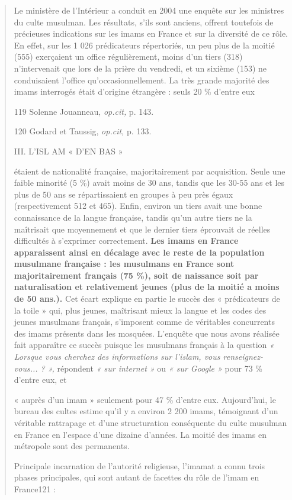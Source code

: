 \begin{quote}
Le ministère de l'Intérieur a conduit en 2004 une enquête sur les
ministres du culte musulman. Les résultats, s'ils sont anciens, offrent
toutefois de précieuses indications sur les imams en France et sur la
diversité de ce rôle. En effet, sur les 1 026 prédicateurs répertoriés,
un peu plus de la moitié (555) exerçaient un office régulièrement, moins
d'un tiers (318) n'intervenait que lors de la prière du vendredi, et un
sixième (153) ne conduisaient l'office qu'occasionnellement. La très
grande majorité des imams interrogés était d'origine étrangère : seuls
20 \% d'entre eux

119 Solenne Jouanneau, \emph{op.cit,} p. 143.

120 Godard et Taussig, \emph{op.cit,} p. 133.

III. L'ISL AM « D'EN BAS »

étaient de nationalité française, majoritairement par acquisition. Seule
une faible minorité (5 \%) avait moins de 30 ans, tandis que les 30-55
ans et les plus de 50 ans se répartissaient en groupes à peu près égaux
(respectivement 512 et 465). Enfin, environ un tiers avait une bonne
connaissance de la langue française, tandis qu'un autre tiers ne la
maîtrisait que moyennement et que le dernier tiers éprouvait de réelles
difficultés à s'exprimer correctement. \textbf{Les imams en France
apparaissent ainsi en décalage avec le reste de la population musulmane
française : les musulmans en France sont majoritairement français (75
\%), soit de naissance soit par naturalisation et relativement jeunes
(plus de la moitié a moins de 50 ans.).} Cet écart explique en partie le
succès des « prédicateurs de la toile » qui, plus jeunes, maîtrisant
mieux la langue et les codes des jeunes musulmans français, s'imposent
comme de véritables concurrents des imams présents dans les mosquées.
L'enquête que nous avons réalisée fait apparaître ce succès puisque les
musulmans français à la question \emph{« Lorsque vous cherchez des
informations sur l'islam, vous renseignez- vous... ? »,} répondent
\emph{« sur internet »} ou \emph{« sur Google »} pour 73 \% d'entre eux,
et

« auprès d'un imam » seulement pour 47 \% d'entre eux. Aujourd'hui, le
bureau des cultes estime qu'il y a environ 2 200 imams, témoignant d'un
véritable rattrapage et d'une structuration conséquente du culte
musulman en France en l'espace d'une dizaine d'années. La moitié des
imams en métropole sont des permanents.

Principale incarnation de l'autorité religieuse, l'imamat a connu trois
phases principales, qui sont autant de facettes du rôle de l'imam en
France121 :
\end{quote}

